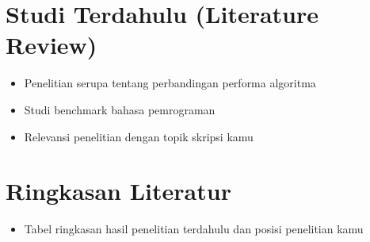 \section{Studi Terdahulu (Literature Review)}
\label{sec:literatureReview}
\begin{itemize}
	\item Penelitian serupa tentang perbandingan performa algoritma
	\item Studi benchmark bahasa pemrograman
	\item Relevansi penelitian dengan topik skripsi kamu
\end{itemize}

\section{Ringkasan Literatur}
\label{sec:ringkasanLiteratur}
\begin{itemize}
	\item Tabel ringkasan hasil penelitian terdahulu dan posisi penelitian kamu
\end{itemize}



